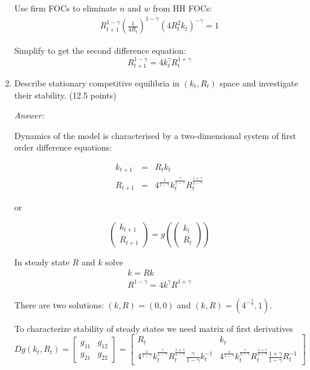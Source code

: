 \documentclass{article}
\begin{document}
\begin{enumerate}
Use firm FOCs to eliminate $n$ and $w$ from HH FOCs:
\begin{eqnarray*}
  R_{t+1}^{1-\gamma}(\frac{1}{4R_t})^{1-\gamma}(4R_t^2k_t)^{-\gamma}=1
\end{eqnarray*}

Simplify to get the second difference equation:
\begin{equation*}
  R_{t+1}^{1-\gamma }=4k_{t}^{\gamma }R_{t}^{1+\gamma }
\end{equation*}


\item Describe stationary competitive equilibria in $(k_{t},R_{t})$ space
and investigate their stability. (12.5 points)

\textit{Answer:}

Dynamics of the model is characterised by a two-dimensional system of
first order difference equations:

\begin{eqnarray*}
  k_{t+1}&=&R_tk_t\\
  R_{t+1}&=&4^\frac{1}{{1-\gamma}}k_{t}^\frac{\gamma}{1-\gamma}R_{t}^\frac{1+\gamma}{1-\gamma}
\end{eqnarray*}

or

\begin{equation*}
  \begin{pmatrix}
    k_{t+1}\\
    R_{t+1}
  \end{pmatrix}
= g(  \begin{pmatrix}
    k_{t}\\
    R_{t}
  \end{pmatrix})
\end{equation*}

In steady state $R$ and $k$ solve
\begin{gather*}
  k=Rk\\
  R^{1-\gamma }=4k^{\gamma}R^{1+\gamma}
\end{gather*}

There are two solutions: $(k,R)=(0,0)$ and $(k,R)=(4^{-\frac{1}{\gamma}}, 1)$.

To characterize stability of steady states we need matrix of first derivatives
\begin{equation*}
  Dg(k_t,R_t)=
  \begin{bmatrix}
    g_{11} & g_{12}\\
    g_{21}&g_{22}
  \end{bmatrix}=
  \begin{bmatrix}
    R_t & k_t\\
    4^\frac{1}{{1-\gamma}}k_{t}^\frac{\gamma}{1-\gamma}R_{t}^\frac{1+\gamma}{1-\gamma} \frac{\gamma}{1-\gamma}k_t^{-1} &
    4^\frac{1}{{1-\gamma}}k_{t}^\frac{\gamma}{1-\gamma}R_{t}^\frac{1+\gamma}{1-\gamma} \frac{1+\gamma}{1-\gamma}R_t^{-1}
  \end{bmatrix}
\end{equation*}


\end{enumerate}
\end{document}
